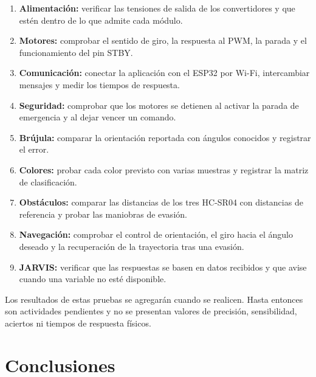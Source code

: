 \documentclass[journal]{IEEEtran}
\begin{document}
\begin{enumerate}[1.]
    \item \textbf{Alimentación:} verificar las tensiones de salida de los convertidores y que estén dentro de lo que admite cada módulo.

    \item \textbf{Motores:} comprobar el sentido de giro, la respuesta al PWM, la parada y el funcionamiento del pin STBY.

    \item \textbf{Comunicación:} conectar la aplicación con el ESP32 por Wi-Fi, intercambiar mensajes y medir los tiempos de respuesta.

    \item \textbf{Seguridad:} comprobar que los motores se detienen al activar la parada de emergencia y al dejar vencer un comando.

    \item \textbf{Brújula:} comparar la orientación reportada con ángulos conocidos y registrar el error.

    \item \textbf{Colores:} probar cada color previsto con varias muestras y registrar la matriz de clasificación.

    \item \textbf{Obstáculos:} comparar las distancias de los tres HC-SR04 con distancias de referencia y probar las maniobras de evasión.

    \item \textbf{Navegación:} comprobar el control de orientación, el giro hacia el ángulo deseado y la recuperación de la trayectoria tras una evasión.

    \item \textbf{JARVIS:} verificar que las respuestas se basen en datos recibidos y que avise cuando una variable no esté disponible.
\end{enumerate}

Los resultados de estas pruebas se agregarán cuando se realicen. Hasta entonces son actividades pendientes y no se presentan valores de precisión, sensibilidad, aciertos ni tiempos de respuesta físicos.


\section{Conclusiones}
\end{document}
